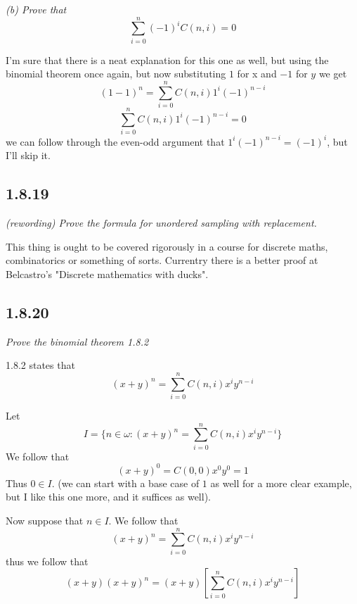\documentclass[11pt,oneside,titlepage]{book}
\newcommand{\set}[1]{\{ #1 \}}
\begin{document}
\textit{(b) Prove that
  $$\sum_{i = 0}^n{(-1)^iC(n, i)} = 0$$
}

I'm sure that there is a neat explanation for this one as well, but using the binomial
theorem once again, but now substituting $1$ for x and $-1$ for $y$ we get
$$(1 - 1)^n = \sum_{i = 0}^n{C(n, i) 1^i (-1)^{n - i}}$$
$$\sum_{i = 0}^n{C(n, i) 1^i (-1)^{n - i}} = 0$$
we can follow through the even-odd argument that $1^i (-1)^{n - i} = (-1)^i$, but I'll
skip it.

\subsection*{1.8.19}

\textit{(rewording) Prove the formula for unordered sampling with replacement.}

This thing is ought to be covered rigorously in a course for discrete maths, combinatorics or
something of sorts.  Currentry there is a better
proof at Belcastro's "Discrete mathematics with ducks".

\subsection*{1.8.20}

\textit{Prove the binomial theorem 1.8.2}

1.8.2 states that
$$(x + y)^n = \sum_{i = 0}^{n}{C(n, i) x^i y^{n - i}}$$

Let
$$I = \set{n \in \omega: (x + y)^n = \sum_{i = 0}^{n}{C(n, i) x^i y^{n - i}}}$$
We follow that
$$(x + y)^0 = C(0, 0)x^0 y^0 = 1$$
Thus $0 \in I$. (we can start with a base case of $1$ as well for a more clear example,
but I like this one more, and it suffices as well).

Now suppose that $n \in I$. We follow that
$$(x + y)^n = \sum_{i = 0}^{n}{C(n, i) x^i y^{n - i}}$$
thus we follow that
$$(x + y)(x + y)^n = (x + y)\left[\sum_{i = 0}^{n}{C(n, i) x^i y^{n - i}}\right]$$
\end{document}

